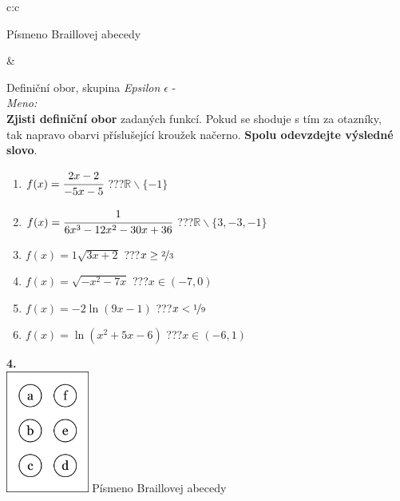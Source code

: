 \documentclass[10pt]{report}
\begin{document}
\begin{tabular}{c:c}
\begin{minipage}[c][99mm][t]{0.49\linewidth}
\begin{center}
\begin{minipage}{0.20\linewidth}
\begin{center}
{\small Písmeno Braillovej abecedy}
\end{center}
\end{minipage}
\end{center}
\end{minipage}
&
\begin{minipage}[c][99mm][t]{0.49\linewidth}
\begin{center}
\vspace{7mm}
{\huge Definiční obor, skupina \textit{Epsilon $\epsilon$} -}\\[4.5mm]
\textit{Meno:}\phantom{xxxxxxxxxxxxxxxxxxxxxxxxxxxxxxxxxxxxxxxxxxxxxxxxxxxxxxxxxxxxxxxxx}\\[3.5mm]
\textbf{Zjisti definiční obor} zadaných funkcí. Pokud se shoduje s tím za otazníky,\\tak napravo obarvi příslušející kroužek načerno. \textbf{Spolu odevzdejte výsledné slovo}.\\[3mm]
\begin{minipage}{0.77\linewidth}
\begin{center}
\begin{varwidth}{\textwidth}
\begin{enumerate}
\normalsize
\item $f(x)=\cfrac{2x-2}{-5x-5}$\quad \dotfill\; ???\;\dotfill \quad $\mathbb{R}\smallsetminus\{-1\}$
\item $f(x)=\cfrac{1}{6x^3-12x^2-30x+36}$\quad \dotfill\; ???\;\dotfill \quad $\mathbb{R}\smallsetminus\{3,-3,-1\}$
\item $f(x)=1\sqrt{3x+2}$\quad \dotfill\; ???\;\dotfill \quad $x\geq\nicefrac{2}{3}$
\item $f(x)=\sqrt{-x^2-7x}$\quad \dotfill\; ???\;\dotfill \quad $x\in(-7 , 0)$
\item $f(x)=-2\ln{(9x-1)}$\quad \dotfill\; ???\;\dotfill \quad $x<\nicefrac{1}{9}$
\item $f(x)=\ln{(x^2+5x-6)}$\quad \dotfill\; ???\;\dotfill \quad $x\in(-6 , 1)$
\end{enumerate}
\end{varwidth}
\end{center}
\end{minipage}
\begin{minipage}{0.20\linewidth}
\begin{center}
{\Huge\bfseries 4.} \\[2mm]
\includegraphics[height=40mm]{../images/braille.png}
{\small Písmeno Braillovej abecedy}
\end{center}
\end{minipage}
\end{center}
\end{minipage}
%
\end{tabular}
\end{document}
